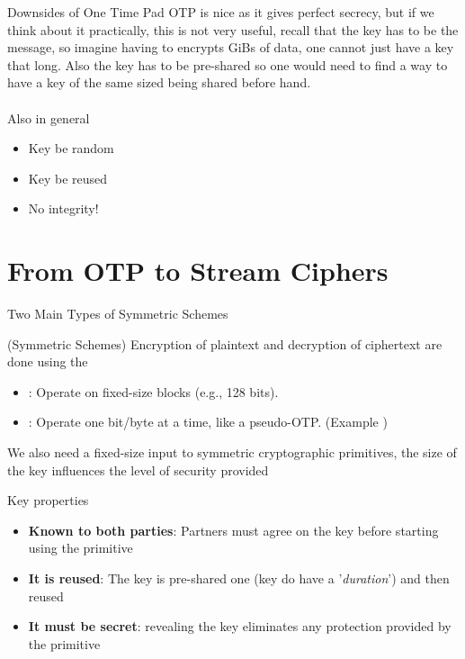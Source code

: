 \begin{parag}{Downsides of One Time Pad}
    OTP is nice as it gives perfect secrecy, but if we think about it practically, this is not very useful, recall that the key has to be  the message, so imagine having to encrypts GiBs of data, one cannot just have a key that long. Also the key has to be pre-shared so one would need to find a way to have a key of the same sized being shared before hand.\\
	$ $\\
	Also in general 
	\begin{itemize}
	    \item Key  be random
	    \item Key  be reused
	    \item No integrity!
	\end{itemize}
	

\end{parag}





\section{From OTP to Stream Ciphers}
\begin{parag}{Two Main Types of Symmetric Schemes}
	\begin{definition}{(Symmetric Schemes)}
	Encryption of plaintext and decryption of ciphertext are done using the 
	\end{definition}
	\begin{itemize}
	    \item {}: Operate on fixed-size blocks (e.g., 128 bits).
	    \item {}: Operate one bit/byte at a time, like a pseudo-OTP. (Example )
	\end{itemize}
	We also need a fixed-size input to symmetric cryptographic primitives, the size of the key influences the level of security provided
	\begin{subparag}{Key properties}
	    \begin{itemize}
	        \item \textbf{Known to both parties}: Partners must agree on the key before starting using the primitive
	        \item \textbf{It is reused}: The key is pre-shared one (key do have a '\textit{duration}') and then reused 
	        \item \textbf{It must be secret}: revealing the key eliminates any protection provided by the primitive
	    \end{itemize}
	\end{subparag}
\end{parag}


